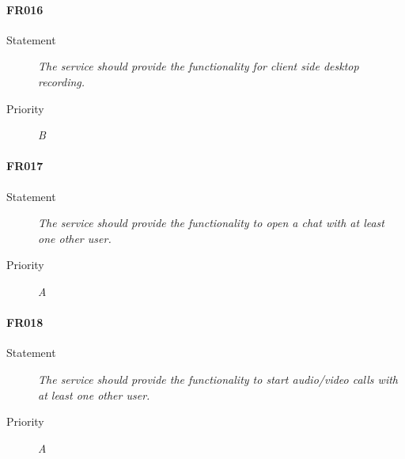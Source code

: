 \paragraph{FR016}
\begin{description}
  \item [Statement] 
    \textit{The service should provide the functionality for client side desktop recording.}
  \item [Priority] \textit{B}
\end{description}

\paragraph{FR017}
\begin{description}
  \item [Statement] 
    \textit{The service should provide the functionality to open a chat with at least one other user.}
  \item [Priority] \textit{A}
\end{description}

\paragraph{FR018}
\begin{description}
  \item [Statement] 
    \textit{The service should provide the functionality to start audio/video calls with at least one other user.}
  \item [Priority] \textit{A}
\end{description}


